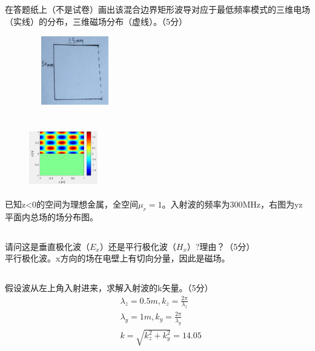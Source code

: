 \documentclass[UTF8]{ctexart}
\begin{document}
\subsection{}
\paragraph{}
在答题纸上（不是试卷）画出该混合边界矩形波导对应于最低频率模式的三维电场（实线）的分布，三维磁场分布（虚线）。（5分）
\begin{figure}[htbp]
\includegraphics[width=4cm,height=3cm]{2015-3.jpg}
\centering
\end{figure}
\section{}
\begin{figure}
\includegraphics[width=3cm]{2015-4.png}
\end{figure}
\paragraph{}
已知z<0的空间为理想金属，全空间$\mu_r=1$。入射波的频率为300MHz，右图为yz平面内总场的场分布图。
\subsection{}
\paragraph{}
请问这是垂直极化波（$E_x$）还是平行极化波（$H_x$）?理由？（5分）\\
平行极化波。x方向的场在电壁上有切向分量，因此是磁场。
\subsection{}
\paragraph{}
假设波从左上角入射进来，求解入射波的k矢量。（5分）
\begin{equation*}
\begin{aligned}
&\lambda_z=0.5m,k_z=\frac{2\pi}{\lambda_z}\\
&\lambda_y=1m,k_y=\frac{2\pi}{\lambda_y}\\
&k=\sqrt{k_z^2 + k_y^2}=14.05
\end{aligned}
\end{equation*}
\end{document}
